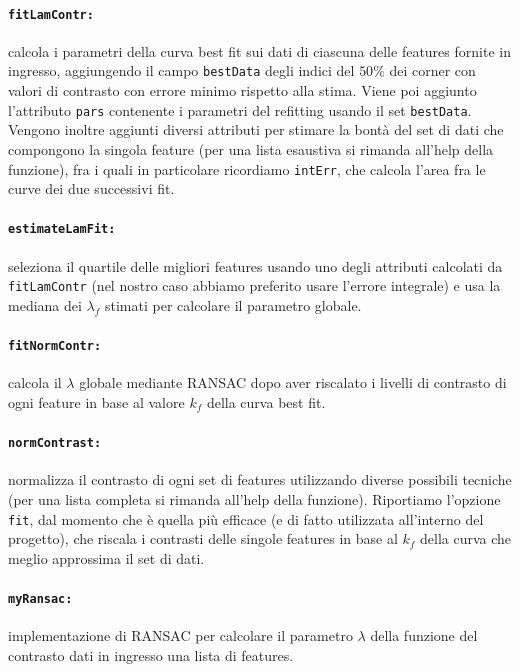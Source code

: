 \documentclass[12pt]{report}
\begin{document}
\paragraph*{\verb_fitLamContr:_} calcola i parametri della curva best fit sui dati di ciascuna delle features fornite in ingresso, aggiungendo il campo \verb|bestData| degli indici del $50\%$ dei corner con valori di contrasto con errore minimo rispetto alla stima. Viene poi aggiunto l'attributo \verb|pars| contenente i parametri del refitting usando il set \verb|bestData|. Vengono inoltre aggiunti diversi attributi per stimare la bont\`a del set di dati che compongono la singola feature (per una lista esaustiva si rimanda all'help della funzione), fra i quali in particolare ricordiamo \verb|intErr|, che calcola l'area fra le curve dei due successivi fit.

\paragraph*{\verb_estimateLamFit:_} seleziona il quartile delle migliori features usando uno degli attributi calcolati da \verb|fitLamContr| (nel nostro caso abbiamo preferito usare l'errore integrale) e usa la mediana dei $\lambda_f$ stimati per calcolare il parametro globale.

\paragraph*{\verb_fitNormContr:_} calcola il $\lambda$ globale mediante RANSAC dopo aver riscalato i livelli di contrasto di ogni feature in base al valore $k_f$ della curva best fit.

\paragraph*{\verb_normContrast:_} normalizza il contrasto di ogni set di features utilizzando diverse possibili tecniche (per una lista completa si rimanda all'help della funzione). Riportiamo l'opzione \verb|fit|, dal momento che \`e quella pi\`u efficace (e di fatto utilizzata all'interno del progetto), che riscala i contrasti delle singole features in base al $k_f$ della curva che meglio approssima il set di dati.

\paragraph*{\verb_myRansac:_} implementazione di RANSAC per calcolare il parametro $\lambda$ della funzione del contrasto dati in ingresso una lista di features.
\end{document}
